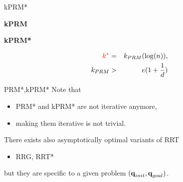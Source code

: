 \begin{frame} {kPRM*}
  \parbox{.49\linewidth} {
    \begin{algorithmic}
      \STATE \textbf{kPRM}
      \ENDIF
      \ENDFOR
      \ENDFOR
    \end{algorithmic}
  }
  \pause
  \parbox{.49\linewidth} {
    \begin{algorithmic}
      \STATE \textbf{kPRM*}
      \ENDFOR
      \ENDFOR
    \end{algorithmic}
    \begin{eqnarray*}
      {\color{red}k^{*}}&=&k_{PRM}(\log(n)),\\
      k_{PRM}&>&e(1+\frac{1}{d})
    \end{eqnarray*}
  }
\end{frame}

%
%

\begin{frame} {PRM*,kPRM*}
  Note that
  \begin{itemize}
  \item PRM* and kPRM* are not iterative anymore,
  \item making them iterative is not trivial.
  \end{itemize}
\end{frame}

%
%

\begin{frame}
  There exists also asymptotically optimal variants of RRT
  \begin{itemize}
    \item RRG, RRT*
  \end{itemize}
  but they are specific to a given problem $(\textbf{q}_{init},\textbf{q}_{goal})$.
\end{frame}
